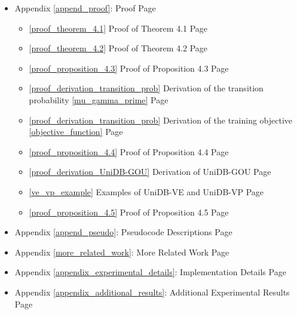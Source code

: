 \begin{itemize}
    \item Appendix \ref{append_proof}: Proof \dotfill Page \pageref{append_proof}
    \begin{itemize}
        \item \ref{proof_theorem_4.1} Proof of Theorem 4.1 \dotfill Page \pageref{proof_theorem_4.1}
        \item \ref{proof_theorem_4.2} Proof of Theorem 4.2 \dotfill Page \pageref{proof_theorem_4.2}
        \item \ref{proof_proposition_4.3} Proof of Proposition 4.3 \dotfill Page \pageref{proof_proposition_4.3}
        \item \ref{proof_derivation_transition_prob} Derivation of the transition probability \eqref{mu_gamma_prime} \dotfill Page \pageref{proof_derivation_transition_prob}
        \item \ref{proof_derivation_transition_prob} Derivation of the training objective \eqref{objective_function} \dotfill Page \pageref{proof_objective_function}
        \item \ref{proof_proposition_4.4} Proof of Proposition 4.4 \dotfill Page \pageref{proof_proposition_4.4}
        \item \ref{proof_derivation_UniDB-GOU} Derivation of UniDB-GOU \dotfill Page \pageref{proof_derivation_UniDB-GOU}
        \item \ref{ve_vp_example} Examples of UniDB-VE and UniDB-VP \dotfill Page \pageref{ve_vp_example}
        \item \ref{proof_proposition_4.5} Proof of Proposition 4.5 \dotfill Page \pageref{proof_proposition_4.5}
    \end{itemize}
    \item Appendix \ref{append_pseudo}: Pseudocode Descriptions \dotfill Page \pageref{append_pseudo}
    \item Appendix \ref{more_related_work}: More Related Work \dotfill Page \pageref{more_related_work}
    \item Appendix \ref{appendix_experimental_details}: Implementation Details \dotfill Page \pageref{appendix_experimental_details}
    \item Appendix \ref{appendix_additional_results}: Additional Experimental Results \dotfill Page \pageref{appendix_additional_results}
\end{itemize}



